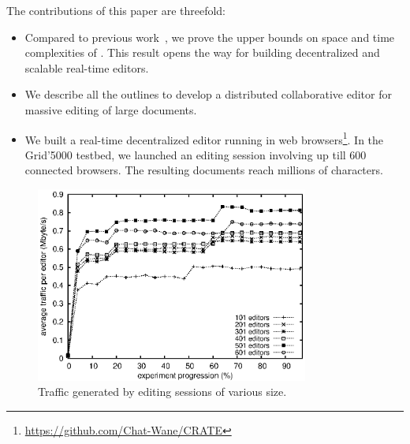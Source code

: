 The contributions of this paper are threefold:
\begin{itemize}
\item Compared to previous work~\cite{nedelec2013concurrency, nedelec2013lseq},
  we prove the upper bounds on space and time complexities of \LSEQ. This result
  opens the way for building decentralized and scalable real-time
  editors. %
\item We describe all the outlines to develop a distributed
  collaborative editor for massive editing of large documents.
\item We built a real-time decentralized editor running in web
  browsers\footnote{\url{https://github.com/Chat-Wane/CRATE}}. In the Grid'5000
  testbed, we launched an editing session involving up till 600 connected
  browsers. The resulting documents reach millions of
  characters. 
\end{itemize}

\begin{figure}
  \centering
  \includegraphics[width=0.8\textwidth]{img/traffic.eps}
  \caption{\label{fig:traffic} Traffic generated by editing sessions of
    various size.}
\end{figure}

